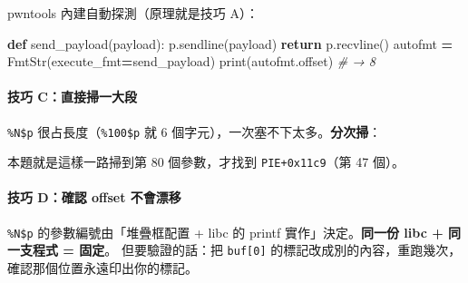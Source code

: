 \documentclass[10pt,a4paper]{article}
\newenvironment{Shaded}{\begin{snugshade}}{\end{snugshade}}
\newcommand{\BuiltInTok}[1]{#1}
\newcommand{\CommentTok}[1]{\textcolor[rgb]{0.56,0.35,0.01}{\textit{#1}}}
\newcommand{\ControlFlowTok}[1]{\textcolor[rgb]{0.13,0.29,0.53}{\textbf{#1}}}
\newcommand{\DecValTok}[1]{\textcolor[rgb]{0.00,0.00,0.81}{#1}}
\newcommand{\KeywordTok}[1]{\textcolor[rgb]{0.13,0.29,0.53}{\textbf{#1}}}
\newcommand{\NormalTok}[1]{#1}
\newcommand{\OperatorTok}[1]{\textcolor[rgb]{0.81,0.36,0.00}{\textbf{#1}}}
\newcommand{\StringTok}[1]{\textcolor[rgb]{0.31,0.60,0.02}{#1}}
\renewenvironment{Shaded}{%
  \def\FrameCommand{\fboxsep=3.2pt\colorbox{shadecolor}}%
  \MakeFramed{\advance\hsize-\width\FrameRestore\small}%
}{%
  \endMakeFramed
}
\begin{document}
pwntools 內建自動探測（原理就是技巧 A）：

\begin{Shaded}
\begin{Highlighting}[]
\KeywordTok{def}\NormalTok{ send\_payload(payload):}
\NormalTok{    p.sendline(payload)}
    \ControlFlowTok{return}\NormalTok{ p.recvline()}
\NormalTok{autofmt }\OperatorTok{=}\NormalTok{ FmtStr(execute\_fmt}\OperatorTok{=}\NormalTok{send\_payload)}
\BuiltInTok{print}\NormalTok{(autofmt.offset)     }\CommentTok{\# → 8}
\end{Highlighting}
\end{Shaded}

\paragraph{技巧
C：直接掃一大段}\label{ux6280ux5de7-cux76f4ux63a5ux6383ux4e00ux5927ux6bb5}

\texttt{\%\allowbreak{}N\$\allowbreak{}p} 很占長度（\texttt{\%\allowbreak{}100\$\allowbreak{}p} 就 6
個字元），一次塞不下太多。\textbf{分次掃}：

\begin{Shaded}
\end{Shaded}

本題就是這樣一路掃到第 80 個參數，才找到 \texttt{PIE+0x11c9}（第 47
個）。

\paragraph{技巧 D：確認 offset
不會漂移}\label{ux6280ux5de7-dux78baux8a8d-offset-ux4e0dux6703ux6f02ux79fb}

\texttt{\%\allowbreak{}N\$\allowbreak{}p} 的參數編號由「堆疊框配置 + libc 的 printf
實作」決定。\textbf{同一份 libc + 同一支程式 = 固定}。 但要驗證的話：把
\texttt{buf{[}0{]}}
的標記改成別的內容，重跑幾次，確認那個位置永遠印出你的標記。
\end{document}
